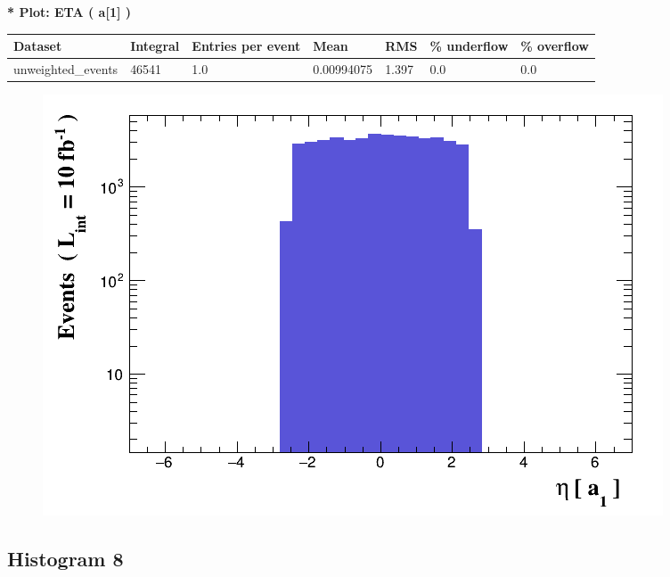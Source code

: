 \documentclass[a4paper, 10pt]{article}
\begin{document}
\textbf{* Plot: ETA ( a[1] ) }\\
   \begin{table}[H]
  \begin{center}
    \begin{tabular}{|m{23.0mm}|m{23.0mm}|m{18.0mm}|m{19.0mm}|m{19.0mm}|m{19.0mm}|m{19.0mm}|}
      \hline
      {\cellcolor{yellow}         Dataset}& {\cellcolor{yellow}         Integral}& {\cellcolor{yellow}         Entries per event}& {\cellcolor{yellow}         Mean}& {\cellcolor{yellow}         RMS}& {\cellcolor{yellow}         \% underflow}& {\cellcolor{yellow}         \% overflow}\\
      \hline
      {\cellcolor{white}         unweighted\_events}& {\cellcolor{white}         46541}& {\cellcolor{white}         1.0}& {\cellcolor{white}         0.00994075}& {\cellcolor{white}         1.397}& {\cellcolor{green}         0.0}& {\cellcolor{green}         0.0}\\
\hline
    \end{tabular}
  \end{center}
\end{table}

\begin{figure}[H]
  \begin{center}
    \includegraphics[scale=0.45]{selection_6.png}\\
\caption{   }
  \end{center}
\end{figure}
      \newpage
\subsection{ Histogram 8}
\end{document}
